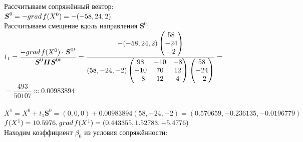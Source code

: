 \documentclass[14pt,a4paper,fleqn]{extarticle}
\begin{document}
	Рассчитываем сопряжённый вектор:\\
	$\boldsymbol{S}^0 = -grad\hspace*{0.05cm}f(X^0) = -(-58,24,2)$\\
	
	Рассчитываем смещение вдоль направления $\boldsymbol{S}^0$:\\
	$t_1 = \dfrac{-grad\hspace*{0.05cm}f(X^0) \cdot \boldsymbol{S}^{0t}}{\boldsymbol{S}^0\boldsymbol{H}\boldsymbol{S}^{0t}} = \dfrac{-(-58,24,2)\begin{pmatrix} 58\\ -24\\ -2\\ \end{pmatrix}}{(58,-24,-2)\begin{pmatrix} 98 & -10 & -8\\ -10 & 70 & 12\\ -8 & 12 & 4\\ \end{pmatrix}\begin{pmatrix} 58\\ -24\\ -2\\ \end{pmatrix}} = $\\
	$= \dfrac{493}{50107} \approx 0.00983894$\\\\
	
	\small $X^1 = X^0 + t_1\boldsymbol{S}^{0} = (0,0,0) + 0.00983894(58,-24,-2) = (0.570659, -0.236135, -0.0196779)$\\
	
	\normalsize $f(X^1) = 10.5976, grad\hspace*{0.05cm}f(X^1) = (0.443355, 1.52783, -5.4776)$\\
	
	Находим коэффициент $\beta_0$ из условия сопряжённости:\\
	
\end{document}
